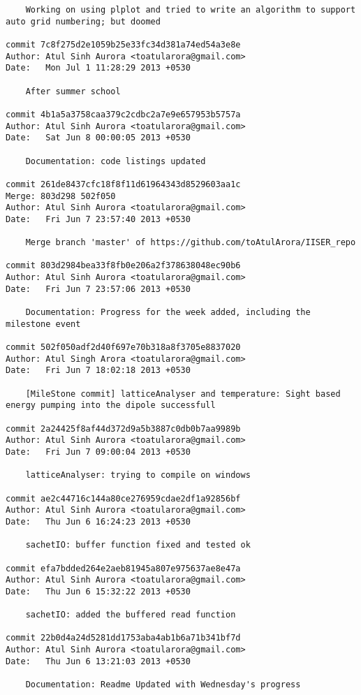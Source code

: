 \begin{lstlisting}
    Working on using plplot and tried to write an algorithm to support auto grid numbering; but doomed

commit 7c8f275d2e1059b25e33fc34d381a74ed54a3e8e
Author: Atul Sinh Aurora <toatularora@gmail.com>
Date:   Mon Jul 1 11:28:29 2013 +0530

    After summer school

commit 4b1a5a3758caa379c2cdbc2a7e9e657953b5757a
Author: Atul Sinh Aurora <toatularora@gmail.com>
Date:   Sat Jun 8 00:00:05 2013 +0530

    Documentation: code listings updated

commit 261de8437cfc18f8f11d61964343d8529603aa1c
Merge: 803d298 502f050
Author: Atul Sinh Aurora <toatularora@gmail.com>
Date:   Fri Jun 7 23:57:40 2013 +0530

    Merge branch 'master' of https://github.com/toAtulArora/IISER_repo

commit 803d2984bea33f8fb0e206a2f378638048ec90b6
Author: Atul Sinh Aurora <toatularora@gmail.com>
Date:   Fri Jun 7 23:57:06 2013 +0530

    Documentation: Progress for the week added, including the milestone event

commit 502f050adf2d40f697e70b318a8f3705e8837020
Author: Atul Singh Arora <toatularora@gmail.com>
Date:   Fri Jun 7 18:02:18 2013 +0530

    [MileStone commit] latticeAnalyser and temperature: Sight based energy pumping into the dipole successfull

commit 2a24425f8af44d372d9a5b3887c0db0b7aa9989b
Author: Atul Sinh Aurora <toatularora@gmail.com>
Date:   Fri Jun 7 09:00:04 2013 +0530

    latticeAnalyser: trying to compile on windows

commit ae2c44716c144a80ce276959cdae2df1a92856bf
Author: Atul Sinh Aurora <toatularora@gmail.com>
Date:   Thu Jun 6 16:24:23 2013 +0530

    sachetIO: buffer function fixed and tested ok

commit efa7bdded264e2aeb81945a807e975637ae8e47a
Author: Atul Sinh Aurora <toatularora@gmail.com>
Date:   Thu Jun 6 15:32:22 2013 +0530

    sachetIO: added the buffered read function

commit 22b0d4a24d5281dd1753aba4ab1b6a71b341bf7d
Author: Atul Sinh Aurora <toatularora@gmail.com>
Date:   Thu Jun 6 13:21:03 2013 +0530

    Documentation: Readme Updated with Wednesday's progress


\end{lstlisting}
